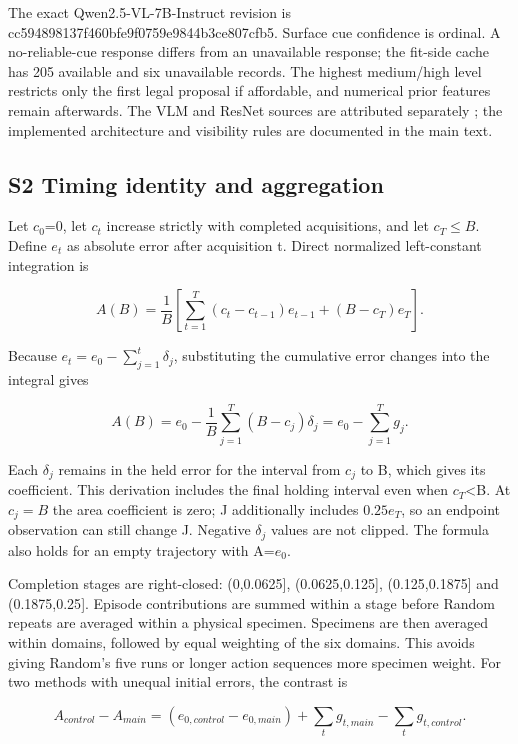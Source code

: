 \documentclass[11pt,a4paper]{article}
\begin{document}
The exact Qwen2.5-VL-7B-Instruct revision is cc594898137f460bfe9f0759e9844b3ce807cfb5. Surface cue confidence is ordinal. A no-reliable-cue response differs from an unavailable response; the fit-side cache has 205 available and six unavailable records. The highest medium/high level restricts only the first legal proposal if affordable, and numerical prior features remain afterwards. The VLM and ResNet sources are attributed separately \citep{bai2025, he2015}; the implemented architecture and visibility rules are documented in the main text.

\subsection{S2 Timing identity and aggregation}\label{s2-timing-identity-and-aggregation}

Let \(c_0\)=0, let \(c_t\) increase strictly with completed acquisitions, and let \(c_T\le B\). Define \(e_t\) as absolute error after acquisition t. Direct normalized left-constant integration is

\[A(B)=\frac{1}{B}\left[\sum_{t=1}^{T}(c_t-c_{t-1})e_{t-1}+(B-c_T)e_T\right].\]

Because \(e_t=e_0-\sum_{j=1}^{t}\delta_j\), substituting the cumulative error changes into the integral gives

\[A(B)=e_0-\frac{1}{B}\sum_{j=1}^{T}(B-c_j)\delta_j=e_0-\sum_{j=1}^{T}g_j.\]

Each \(\delta_j\) remains in the held error for the interval from \(c_j\) to B, which gives its coefficient. This derivation includes the final holding interval even when \(c_T\)\textless B. At \(c_j=B\) the area coefficient is zero; J additionally includes \(0.25e_T\), so an endpoint observation can still change J. Negative \(\delta_j\) values are not clipped. The formula also holds for an empty trajectory with A=\(e_0\).

Completion stages are right-closed: (0,0.0625{]}, (0.0625,0.125{]}, (0.125,0.1875{]} and (0.1875,0.25{]}. Episode contributions are summed within a stage before Random repeats are averaged within a physical specimen. Specimens are then averaged within domains, followed by equal weighting of the six domains. This avoids giving Random's five runs or longer action sequences more specimen weight. For two methods with unequal initial errors, the contrast is

\[A_{control}-A_{main}=(e_{0,control}-e_{0,main})+\sum_t g_{t,main}-\sum_t g_{t,control}.\]
\end{document}
